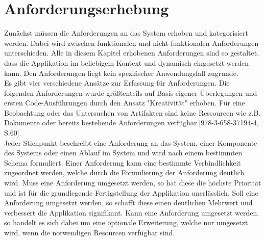 \section{Anforderungserhebung}
Zunächst müssen die Anforderungen an das System erhoben und kategorisiert werden. Dabei wird zwischen funktionalen und nicht-funktionalen Anforderungen unterschieden. Alle in diesem Kapitel erhobenen Anforderungen sind so gestaltet, dass die Applikation im beliebigem Kontext  und dynamisch eingesetzt werden kann. Den Anforderungen liegt kein spezifischer Anwendungsfall zugrunde.\\
Es gibt vier verschiedene Ansätze zur Erfassung für Anforderungen. Die folgenden Anforderungen wurde größtenteils auf Basis eigener Überlegungen und ersten Code-Ausführungen durch den Ansatz "Kreativität" erhoben. Für eine Beobachtung oder das Untersuchen von Artifakten sind keine Ressourcen wie z.B. Dokumente oder bereits bestehende Anforderungen verfügbar.[978-3-658-37194-4, S.60]. \\
Jeder Stichpunkt beschreibt eine Anforderung an das System, einer Komponente des Systems oder einen Ablauf im System und wird nach einem bestimmten Schema formuliert. Einer Anforderung kann eine bestimmte Verbindlichkeit zugeordnet werden, welche durch die Formulierung der Anforderung deutlich wird. Muss eine Anforderung umgesetzt werden, so hat diese die höchste Priorität und ist für die grundlegende Fertigstellung der Applikation unerlässlich. Soll eine Anforderung umgesetzt werden, so schafft diese einen deutlichen Mehrwert und verbessert die Applikation signifikant. Kann eine Anforderung umgesetzt werden, so handelt es sich dabei um eine optionale Erweiterung, welche nur umgesetzt wird, wenn die notwendigen Resourcen verfügbar sind.
